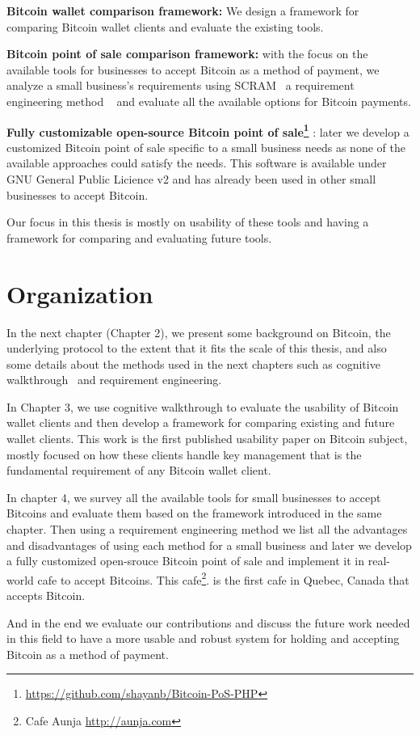 \textbf{Bitcoin wallet comparison framework:} We design a framework for comparing Bitcoin wallet clients and evaluate the existing tools.

\textbf{Bitcoin point of sale comparison framework: } with the focus on the available tools for businesses to accept Bitcoin as a method of payment, we analyze a small business's requirements using SCRAM~\cite{REScenario} a requirement engineering method ~\cite{dorfman1990system} and evaluate all the available options for Bitcoin payments.

\textbf{Fully customizable open-source Bitcoin point of sale\footnote{\url{https://github.com/shayanb/Bitcoin-PoS-PHP}} }: later we develop a customized Bitcoin point of sale specific to a small business needs as none of the available approaches could satisfy the needs. This software is available under GNU General Public Licience v2 and has already been used in other small businesses to accept Bitcoin.

Our focus in this thesis is mostly on usability of these tools and having a framework for comparing and evaluating future tools.

\section{Organization}
In the next chapter (Chapter 2), we present some background on Bitcoin, the underlying protocol to the extent that it fits the scale of this thesis, and also some details about the methods used in the next chapters such as cognitive walkthrough~\cite{WRLP94}  and requirement engineering.

In Chapter 3, we use cognitive walkthrough to evaluate the usability of Bitcoin wallet clients and then develop a framework for comparing existing and future wallet clients. This work is the first published usability paper on Bitcoin subject, mostly focused on how these clients handle key management that is the fundamental requirement of any Bitcoin wallet client.

In chapter 4, we survey all the available tools for small businesses to accept Bitcoins and evaluate them based on the framework introduced in the same chapter. Then using a requirement engineering method we list all the advantages and disadvantages of using each method for a small business and later we develop a fully customized open-srouce Bitcoin point of sale and implement it in real-world cafe to accept Bitcoins. This cafe\footnote{ Cafe Aunja \url{http://aunja.com}}. is the first cafe in Quebec, Canada that accepts Bitcoin.

And in the end we evaluate our contributions and discuss the future work needed in this field to have a more usable and robust system for holding and accepting Bitcoin as a method of payment.